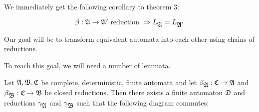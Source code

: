 We immediately get the following corollary to theorem 3:

\begin{corollary}
\[ \beta : \mbox{$\mathfrak{A}$} \to \mbox{$\mathfrak{A'}$} \text{ reduction } \Rightarrow L_{\mbox{$\mathfrak{A}$}} =
L_{\mbox{$\mathfrak{A}$}'} \]
\end{corollary}

Our goal will be to transform equivalent automata into each other using chains
of reductions.

To reach this goal, we will need a number of lemmata.

\begin{lemma}
Let $\mbox{$\mathfrak{A}$}, \mbox{$\mathfrak{B}$}, \mbox{$\mathfrak{C}$}$ be complete, deterministic, finite automata and let
$\beta_{\mbox{$\mathfrak{A}$}} : \mbox{$\mathfrak{C}$} \to \mbox{$\mathfrak{A}$}$ and $\beta_{\mbox{$\mathfrak{B}$}} : \mbox{$\mathfrak{C}$} \to \mbox{$\mathfrak{B}$}$ be
closed reductions. Then there exists a finite automaton $\mbox{$\mathfrak{D}$}$ and reductions
$\gamma_{\mbox{$\mathfrak{A}$}}$ and $\gamma_{\mbox{$\mathfrak{B}$}}$ such that the following diagram
commutes:

\begin{center}
\end{center}
\end{lemma}

